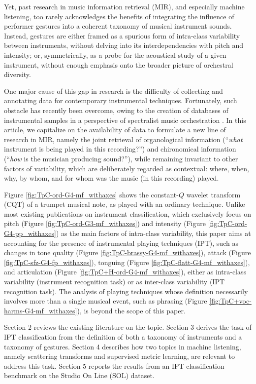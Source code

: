 \documentclass{article}
\begin{document}
Yet, past research in music information retrieval (MIR), and especially machine listening, too rarely acknowledges the benefits of integrating the influence of performer gestures into a coherent taxonomy of musical instrument sounds.
Instead, gestures are either framed as a spurious form of intra-class variability between instruments, without delving into its interdependencies with pitch and intensity;
or, symmetrically, as a probe for the acoustical study of a given instrument, without enough emphasis onto the broader picture of orchestral diversity.

One major cause of this gap in research is the difficulty of collecting and annotating data for contemporary instrumental techniques.
Fortunately, such obstacle has recently been overcome, owing to the creation of databases of instrumental samples in a perspective of spectralist music orchestration \cite{maresz2013cmr}.
In this article, we capitalize on the availability of data to formulate a new line of research in MIR, namely the joint retrieval of organological information (``\emph{what} instrument is being played in this recording?'') and chironomical information (``\emph{how} is the musician producing sound?''), while remaining invariant to other factors of variability, which are deliberately regarded as contextual: where, when, why, by whom, and for whom was the music (in this recording) played.

Figure \ref{fig:TpC-ord-G4-mf_withaxes} shows the constant-$Q$ wavelet transform (CQT) of a trumpet musical note, as played with an ordinary technique.
Unlike most existing publications on instrument classification, which exclusively focus on pitch (Figure \ref{fig:TpC-ord-G3-mf_withaxes}) and intensity (Figure \ref{fig:TpC-ord-G4-pp_withaxes}) as the main factors of intra-class variability, this paper aims at accounting for the presence of instrumental playing techniques (IPT), such as changes in tone quality (Figure \ref{fig:TpC-brassy-G4-mf_withaxes}), attack (Figure \ref{fig:TpC-sfz-G4-fp_withaxes}), tonguing (Figure \ref{fig:TpC-flatt-G4-mf_withaxes}), and articulation (Figure \ref{fig:TpC+H-ord-G4-mf_withaxes}), either as intra-class variability (instrument recognition task) or as inter-class variability (IPT recognition task).
The analysis of playing techniques whose definition necessarily involves more than a single musical event, such as phrasing (Figure \ref{fig:TpC+voc-harms-G4-mf_withaxes}), is beyond the scope of this paper.


Section 2 reviews the existing literature on the topic.
Section 3 derives the task of IPT classification from the definition of both a taxonomy of instruments and a taxonomy of gestures.
Section 4 describes how two topics in machine listening, namely scattering transforms and supervised metric learning, are relevant to address this task.
Section 5 reports the results from an IPT classification benchmark on the Studio On Line (SOL) dataset.
\end{document}
